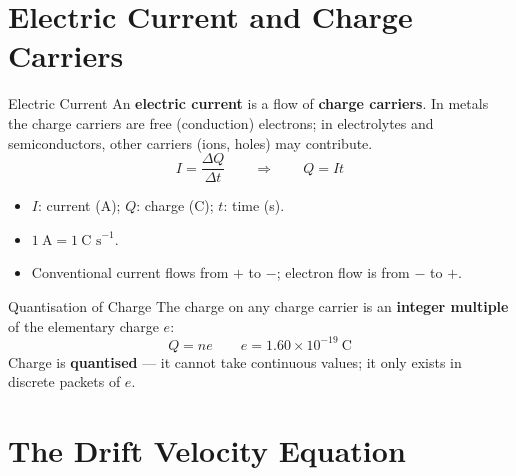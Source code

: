 

\section{Electric Current and Charge Carriers}

\begin{definitionbox}{Electric Current}
An \textbf{electric current} is a flow of \textbf{charge carriers}. In metals the charge carriers are free (conduction) electrons; in electrolytes and semiconductors, other carriers (ions, holes) may contribute.
$$I = \frac{\Delta Q}{\Delta t} \qquad \Longrightarrow \qquad Q = It$$
\begin{itemize}[itemsep=2pt]
  \item $I$: current (A); \quad $Q$: charge (C); \quad $t$: time (s).
  \item $1\ \text{A} = 1\ \text{C s}^{-1}$.
  \item Conventional current flows from $+$ to $-$; electron flow is from $-$ to $+$.
\end{itemize}
\end{definitionbox}

\begin{definitionbox}{Quantisation of Charge}
The charge on any charge carrier is an \textbf{integer multiple} of the elementary charge $e$:
$$Q = ne \qquad e = 1.60 \times 10^{-19}\ \text{C}$$
Charge is \textbf{quantised} — it cannot take continuous values; it only exists in discrete packets of $e$.
\end{definitionbox}

\section{The Drift Velocity Equation}

